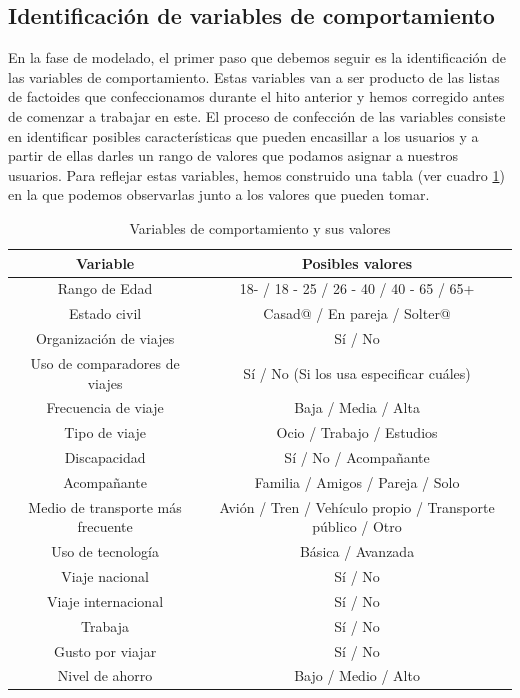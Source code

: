 \subsection{Identificación de variables de comportamiento}
En la fase de modelado, el primer paso que debemos seguir es la identificación de las variables de comportamiento. Estas variables van a ser producto de las listas de factoides que confeccionamos durante el hito anterior y hemos corregido antes de comenzar a trabajar en este. El proceso de confección de las variables consiste en identificar posibles características que pueden encasillar a los usuarios y a partir de ellas darles un rango de valores que podamos asignar a nuestros usuarios. Para reflejar estas variables, hemos construido una tabla (ver cuadro \ref{table:variables-comportamiento}) en la que podemos observarlas junto a los valores que pueden tomar.
\begin{table}[h]
    \centering
    \begin{tabular}{|c|c|}
        \hline
        \textbf{Variable} & \textbf{Posibles valores} \\ \hline
        Rango de Edad & 18- / 18 - 25 / 26 - 40 / 40 - 65 / 65+ \\ \hline
        Estado civil & Casad@ / En pareja / Solter@ \\ \hline
        Organización de viajes & Sí / No \\ \hline
        Uso de comparadores de viajes & Sí / No (Si los usa especificar cuáles) \\ \hline
        Frecuencia de viaje & Baja / Media / Alta \\ \hline
        Tipo de viaje & Ocio / Trabajo / Estudios \\ \hline
        Discapacidad & Sí / No / Acompañante \\ \hline
        Acompañante & Familia / Amigos / Pareja / Solo \\ \hline
        Medio de transporte más frecuente & Avión / Tren / Vehículo propio / Transporte público / Otro \\ \hline
        Uso de tecnología & Básica / Avanzada \\ \hline
        Viaje nacional & Sí / No \\ \hline
        Viaje internacional & Sí / No \\ \hline
        Trabaja & Sí / No \\ \hline
        Gusto por viajar & Sí / No \\ \hline
        Nivel de ahorro & Bajo / Medio / Alto \\ \hline
    \end{tabular}
    \caption{Variables de comportamiento y sus valores}
    \label{table:variables-comportamiento}
\end{table}
